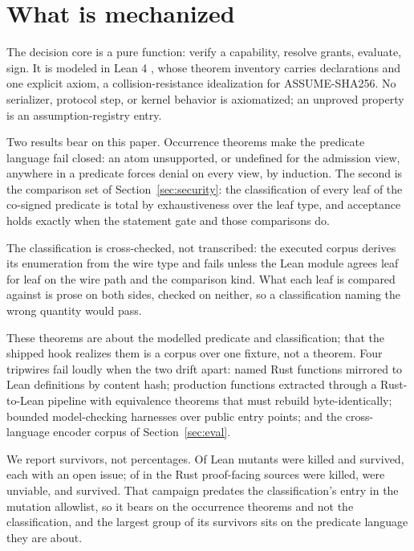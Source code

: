 \section{What is mechanized}
\label{sec:formal}

The decision core is a pure function: verify a capability, resolve grants,
evaluate, sign. It is modeled in Lean 4 \cite{lean4}, whose theorem
inventory carries \PSTheoremCount{} declarations and one explicit axiom, a
collision-resistance idealization for ASSUME-SHA256. No serializer, protocol step, or kernel behavior is axiomatized;
an unproved property is an assumption-registry entry.

Two results bear on this paper. Occurrence theorems make the predicate language
fail closed: an atom unsupported, or undefined for the admission view, anywhere
in a predicate forces denial on every view, by induction. The second is the
comparison set of Section~\ref{sec:security}: the classification of every leaf of the co-signed
predicate is total by exhaustiveness over the leaf type, and acceptance
holds exactly when the statement gate and those comparisons do.

The classification is cross-checked, not transcribed: the executed corpus
derives its enumeration from the wire type and fails unless the Lean module
agrees leaf for leaf on the wire path and the comparison kind. What each leaf is
compared against is prose on both sides, checked on neither, so a
classification naming the wrong quantity would pass.

 These theorems are about the
modelled predicate and classification; that the shipped hook realizes them
is a corpus over one fixture, not a theorem. Four tripwires fail
loudly when the two drift apart: named Rust functions mirrored to Lean
definitions by content hash; \PSAeneasFunctionCount{} production functions
extracted through a Rust-to-Lean pipeline with equivalence theorems that must
rebuild byte-identically; \PSKaniHarnessCount{} bounded model-checking harnesses
over public entry points; and the cross-language encoder corpus of
Section~\ref{sec:eval}.

We report survivors, not percentages. Of \PSLeanMutants{} Lean
mutants \PSLeanMutantsKilled{} were killed and \PSLeanMutantsSurvived{} survived, each
with an open issue; of \PSProofMutants{} in the Rust proof-facing sources
\PSProofMutantsKilled{} were killed, \PSProofMutantsUnviable{} were unviable,
and \PSProofMutantsSurvived{} survived.
That campaign predates the classification's entry in the mutation allowlist, so
it bears on the occurrence theorems and not the classification, and the
largest group of its survivors sits on the predicate language they are about.
